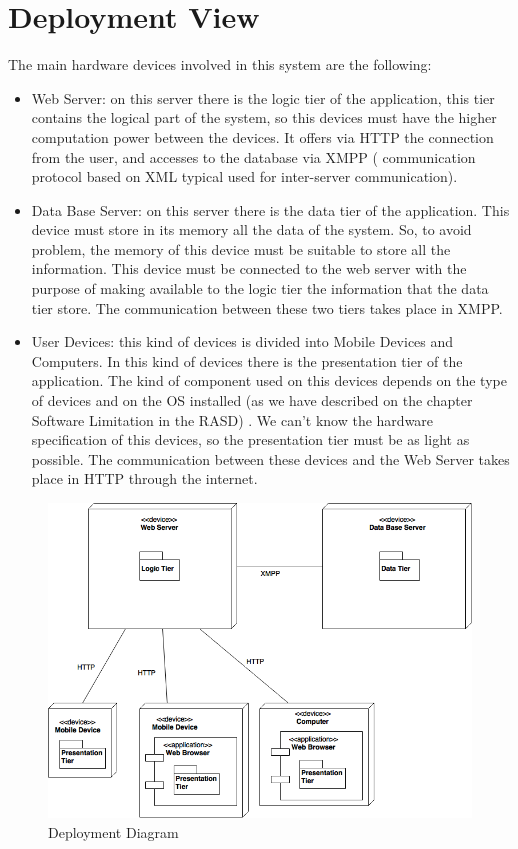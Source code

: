 \documentclass[../../../../dd.tex]{subfiles}
\begin{document}
	\section{Deployment View}
		
		The main hardware devices involved in this system are the following:
		\begin{itemize} 
		\item Web Server: on this server there is the logic tier of the application, this tier contains the logical part of the system, so this devices must have the higher computation power between the devices. It offers via HTTP the connection from the user, and accesses to the database via XMPP ( communication protocol based on XML typical used for inter-server communication).
		\item Data Base Server: on this server there is the data tier of the application. This device must store in its memory all the data of the system. So, to avoid problem, the memory of this device must be suitable to store all the information. This device must be connected to the web server with the purpose of making available to the logic tier the information that the data tier store. The communication between these two tiers takes place in XMPP.
		\item User Devices: this kind of devices is divided into Mobile Devices and Computers. In this kind of devices there is the presentation tier of the application. The kind of component used on this devices depends on the type of devices and on the OS installed (as we have described on the chapter Software Limitation in the RASD) . We can't know the hardware specification of this devices, so the presentation tier must be as light as possible. The communication between these devices and the Web Server takes place in HTTP through the internet.
	\end{itemize}
	
	
	\begin{figure}[H]
				\centering
				\includegraphics[width=\textwidth, scale=0.5]{../images/Deploy.png}
			\caption{Deployment Diagram}\label{fig:Deploy}
		\end{figure}
	
\end{document}
